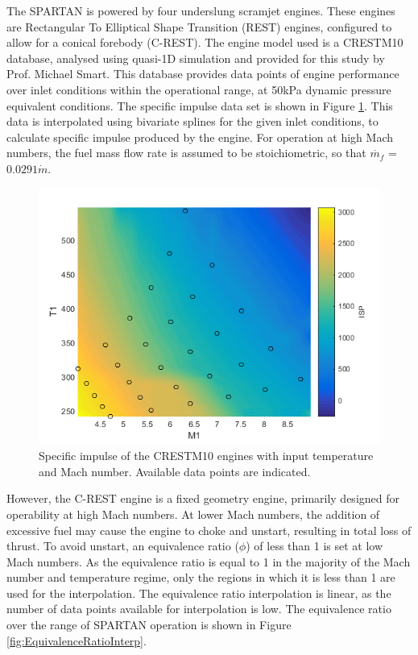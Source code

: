 The SPARTAN is powered by four underslung scramjet engines. These engines are Rectangular To Elliptical Shape Transition (REST) engines, configured to allow for a conical forebody (C-REST). The engine model used is a CRESTM10 database\cite{Preller2017}, analysed using quasi-1D simulation and provided for this study by Prof. Michael Smart.
This database provides data points of engine performance over inlet conditions within the operational range, at 50kPa dynamic pressure equivalent conditions. The specific impulse data set is shown in Figure \ref{fig:ISPinterp}. This data is interpolated using bivariate splines for the given inlet conditions, to calculate specific impulse produced by the engine. 
For operation at high Mach numbers, the fuel mass flow rate is assumed to be stoichiometric, so that $\dot{m_f}$ = $0.0291\dot{m}$.
\begin{figure}[ht]
	\centering
	\includegraphics[width=0.6\linewidth]{figures/3_vehicle_design/ISPinterp}
	\caption{Specific impulse of the CRESTM10 engines with input temperature and Mach number. Available data points are indicated.}
	\label{fig:ISPinterp}
\end{figure}
However, the C-REST engine is a fixed geometry engine, primarily designed for operability at high Mach numbers\cite{Preller2017}. At lower Mach numbers, the addition of excessive fuel may cause the engine to choke and unstart, resulting in total loss of thrust\cite{Preller2017}. To avoid unstart, an equivalence ratio ($\phi$) of less than 1 is set at low Mach numbers. As the equivalence ratio is equal to 1 in the majority of the Mach number and temperature regime, only the regions in which it is less than 1 are used for the interpolation. The equivalence ratio interpolation is linear, as the number of data points available for interpolation is low. The equivalence ratio over the range of SPARTAN operation is shown in Figure \ref{fig:EquivalenceRatioInterp}.
